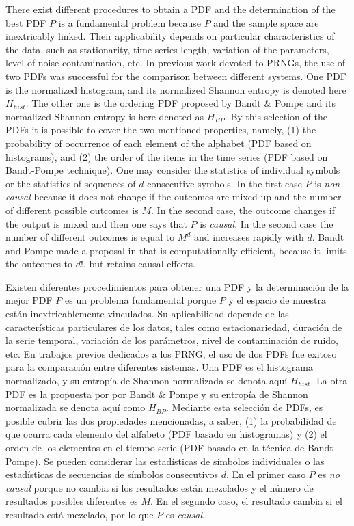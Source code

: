 There exist different procedures to obtain a PDF \cite{Rosso2009,DeMicco2008,Mischaikow1999,Powell1979,Rosso2001,Pompe2002} and the determination of the best PDF $P$ is a fundamental problem because $P$ and the sample space are inextricably linked. Their applicability depends on particular characteristics of the data, such as stationarity, time series length, variation of the parameters, level of noise contamination, etc. In previous work devoted to PRNGs, the use of two
PDFs was successful for the comparison between different systems. One PDF is the
normalized histogram, and its normalized Shannon
entropy is denoted here $H_{hist}$. The other one is the ordering PDF
proposed by Bandt \& Pompe \cite{Pompe2002} and its  normalized Shannon entropy is  here denoted as $H_{BP}$. By this selection of the PDFs it is possible to cover the two mentioned properties, namely, (1) the probability of occurrence of each element of the alphabet (PDF based on histograms), and (2) the order of the items in the time series (PDF based on Bandt-Pompe technique).
One may consider the statistics of individual symbols or the statistics of sequences of $d$ consecutive symbols. In the first case $P$ is \textsl{non-causal} because it does not change if the outcomes are mixed up and the number of different possible outcomes is $M$. In the second case, the outcome changes if the output is mixed and then one says that $P$ is \textsl{causal}. In the second case the number of different outcomes is equal to $M^d$ and increases rapidly with $d$. Bandt and Pompe made a proposal in \cite{Pompe2002} that is computationally efficient, because it limits the outcomes to $d!$, but retains causal effects.

Existen diferentes procedimientos para obtener una PDF \cite{Rosso2009, DeMicco2008, Mischaikow1999, Powell1979, Rosso2001, Pompe2002} y la determinación de la mejor PDF $P$ es un problema fundamental porque $P$ y el espacio de muestra están inextricablemente vinculados.
Su aplicabilidad depende de las características particulares de los datos, tales como estacionariedad, duración de la serie temporal, variación de los parámetros, nivel de contaminación de ruido, etc.
En trabajos previos dedicados a los PRNG, el uso de dos PDFs fue exitoso para la comparación entre diferentes sistemas.
Una PDF es el histograma normalizado, y su entropía de Shannon normalizada se denota aquí $H_{hist}$.
La otra PDF es la propuesta por por Bandt \& Pompe \cite{Pompe2002} y su entropía de Shannon normalizada se denota aquí como $H_{BP}$.
Mediante esta selección de PDFs, es posible cubrir las dos propiedades mencionadas, a saber, (1) la probabilidad de que ocurra cada elemento del alfabeto (PDF basado en histogramas) y (2) el orden de los elementos en el tiempo serie (PDF basado en la técnica de Bandt-Pompe).
Se pueden considerar las estadísticas de símbolos individuales o las estadísticas de secuencias de símbolos consecutivos $d$.
En el primer caso $P$ es \textit{no causal} porque no cambia si los resultados están mezclados y el número de resultados posibles diferentes es $M$.
En el segundo caso, el resultado cambia si el resultado está mezclado, por lo que $P$ es \textit{causal}.

